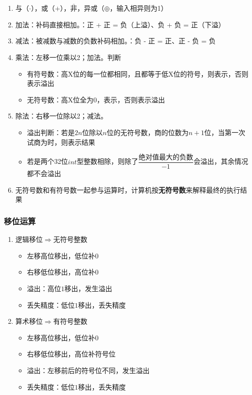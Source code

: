 \documentclass[a4paper,12pt]{article}
\begin{document}
    \begin{enumerate}
        \item 与（$\cdot$），或（$+$），$\overline{\text{非}}$，异或（$\oplus$，输入相异则为1）
        \item 加法：补码直接相加。{\color{red}{溢出}}：正 + 正 = 负（上溢）、负 + 负 = 正（下溢）
        \item 减法：被减数与减数的负数补码相加。{\color{red}{溢出}}：负 - 正 = 正、正 - 负 = 负
        \item 乘法：左移一位乘以2；加法。{\color{red}{溢出}}判断
        \begin{itemize}
            \item 有符号数：高X位的每一位都相同，且都等于低X位的符号，则表示{\color{red}{不溢出}}，否则表示溢出
            \item 无符号数：高X位全为0，表示{\color{red}{不溢出}}，否则表示溢出
        \end{itemize}
        \item 除法：右移一位除以2；减法。
        \begin{itemize}
            \item 溢出判断：若是$2n$位除以$n$位的无符号数，商的位数为$n + 1$位，当第一次试商为{\color{red}{1}}时，则表示结果{\color{red}{溢出}}
            \item 若是两个32位$int$型整数相除，则除了$\dfrac{\textbf{绝对值最大的负数}}{-1}$会溢出，其余情况都不会溢出
        \end{itemize}
        \item 无符号数和有符号数一起参与运算时，计算机按\textbf{无符号数}来解释最终的执行结果
    \end{enumerate}

    \subsubsection{移位运算}

    \begin{enumerate}
        \item 逻辑移位$\Rightarrow$无符号整数
        \begin{itemize}
            \item 左移高位移出，低位补0
            \item 右移低位移出，高位补0
            \item {\color{red}溢出}：高位$1$移出，发生溢出
            \item {\color{red}丢失精度}：低位$1$移出，丢失精度
        \end{itemize}
        \item 算术移位$\Rightarrow$有符号整数
        \begin{itemize}
            \item 左移高位移出，低位补0
            \item 右移低位移出，高位补{\color{red}符号位}
            \item {\color{red}溢出}：左移前后的符号位不同，发生溢出
            \item {\color{red}丢失精度}：低位$1$移出，丢失精度
        \end{itemize}
    \end{enumerate}
\end{document}
